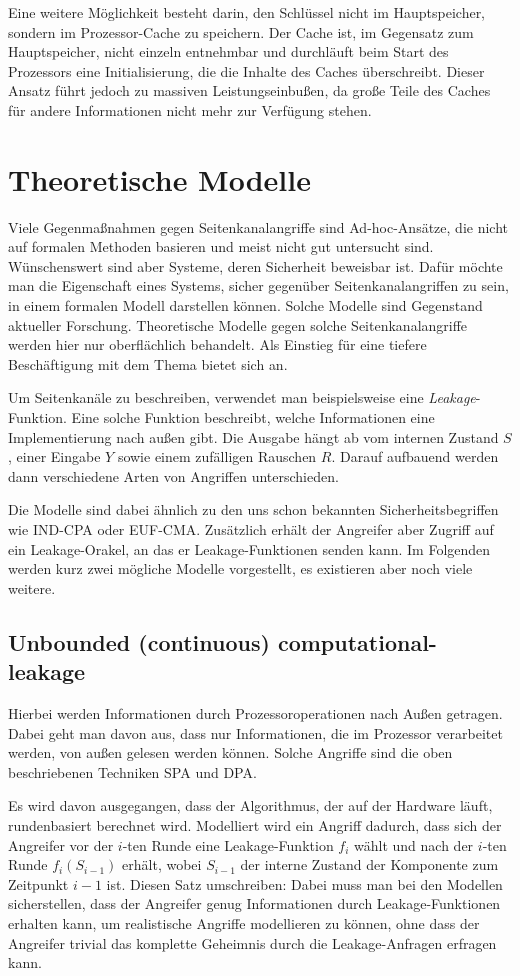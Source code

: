 Eine weitere Möglichkeit besteht darin, den Schlüssel nicht im
Hauptspeicher, sondern im Prozessor-Cache zu speichern. Der Cache ist,
im Gegensatz zum Hauptspeicher, nicht einzeln entnehmbar und durchläuft
beim Start des Prozessors eine Initialisierung, die die Inhalte des
Caches überschreibt. Dieser Ansatz führt jedoch zu massiven
Leistungseinbußen, da große Teile des Caches für andere Informationen
nicht mehr zur Verfügung stehen.
\section{Theoretische Modelle}
Viele Gegenmaßnahmen gegen Seitenkanalangriffe sind \glqq
Ad-hoc\grqq-Ansätze, die nicht auf formalen Methoden
basieren und meist nicht gut untersucht sind. Wünschenswert sind aber Systeme, deren Sicherheit beweisbar
ist. Dafür möchte man die Eigenschaft eines Systems, sicher gegenüber
Seitenkanalangriffen zu sein, in einem formalen Modell darstellen
können. Solche Modelle sind Gegenstand aktueller Forschung. Theoretische
Modelle gegen solche Seitenkanalangriffe werden hier nur oberflächlich
behandelt. Als Einstieg für eine tiefere Beschäftigung mit dem Thema
bietet sich \cite{mol2010} an.

Um Seitenkanäle zu beschreiben, verwendet man beispielsweise eine
\emph{Leakage}-Funktion. Eine solche Funktion beschreibt, welche
Informationen eine Implementierung nach außen gibt. Die Ausgabe hängt ab
vom internen Zustand $S$, einer Eingabe $Y$ sowie einem zufälligen
Rauschen $R$. Darauf aufbauend werden dann verschiedene Arten von
Angriffen unterschieden. 

Die Modelle sind dabei ähnlich zu den uns schon bekannten
Sicherheitsbegriffen wie IND-CPA oder EUF-CMA. Zusätzlich erhält der
Angreifer aber Zugriff auf ein Leakage-Orakel, an das er
Leakage-Funktionen senden kann. Im Folgenden werden kurz zwei mögliche
Modelle vorgestellt, es existieren aber noch viele weitere.
\subsection{Unbounded (continuous) computational-leakage}
Hierbei werden Informationen durch Prozessoroperationen nach Außen
getragen. Dabei geht man davon aus, dass nur Informationen, die im
Prozessor verarbeitet werden, von außen gelesen werden können. Solche
Angriffe sind die oben beschriebenen Techniken SPA und DPA.

Es wird davon ausgegangen, dass der Algorithmus, der auf der Hardware
läuft, rundenbasiert berechnet wird. Modelliert wird ein Angriff
dadurch, dass sich der Angreifer vor der $i$-ten Runde eine
Leakage-Funktion $f_i$ wählt und nach der $i$-ten Runde $f_i(S_{i-1})$
erhält, wobei $S_{i-1}$ der interne Zustand der Komponente zum
Zeitpunkt $i-1$ ist. Diesen Satz umschreiben: Dabei muss man bei den
Modellen sicherstellen, dass der Angreifer genug Informationen durch
Leakage-Funktionen erhalten kann, um realistische Angriffe modellieren
zu können, ohne dass der Angreifer trivial das komplette Geheimnis durch
die Leakage-Anfragen erfragen kann. 

